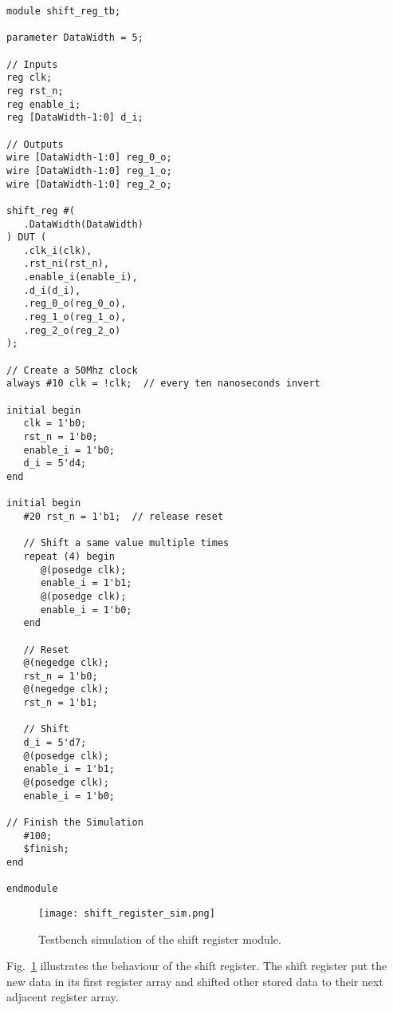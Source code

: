 \begin{verbatim}
module shift_reg_tb;

parameter DataWidth = 5;

// Inputs
reg clk;
reg rst_n;
reg enable_i;
reg [DataWidth-1:0] d_i;

// Outputs
wire [DataWidth-1:0] reg_0_o;
wire [DataWidth-1:0] reg_1_o;
wire [DataWidth-1:0] reg_2_o;

shift_reg #(
   .DataWidth(DataWidth)
) DUT (
   .clk_i(clk),
   .rst_ni(rst_n),
   .enable_i(enable_i),
   .d_i(d_i),
   .reg_0_o(reg_0_o),
   .reg_1_o(reg_1_o),
   .reg_2_o(reg_2_o)
);

// Create a 50Mhz clock
always #10 clk = !clk;  // every ten nanoseconds invert

initial begin
   clk = 1'b0;
   rst_n = 1'b0;
   enable_i = 1'b0;
   d_i = 5'd4;
end

initial begin
   #20 rst_n = 1'b1;  // release reset

   // Shift a same value multiple times
   repeat (4) begin
      @(posedge clk);
      enable_i = 1'b1;
      @(posedge clk);
      enable_i = 1'b0;
   end

   // Reset
   @(negedge clk);
   rst_n = 1'b0;
   @(negedge clk);
   rst_n = 1'b1;

   // Shift
   d_i = 5'd7;
   @(posedge clk);
   enable_i = 1'b1;
   @(posedge clk);
   enable_i = 1'b0;

// Finish the Simulation
   #100;
   $finish;
end

endmodule
\end{verbatim}

\begin{figure}[htbp]
   \centerline{
   \texttt{[image: shift\_register\_sim.png]}}
   \caption{Testbench simulation of the shift register module.}
   \label{fig:shift_register_sim}
\end{figure}

Fig.~\ref{fig:shift_register_sim} illustrates the behaviour of the shift register. The shift register put the new data in its first register array and shifted other stored data to their next adjacent register array.
